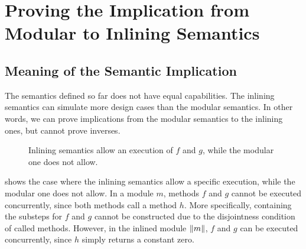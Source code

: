 \chapter{Proving the Implication from Modular to Inlining Semantics}
\label{chap-implication}

\section{Meaning of the Semantic Implication} %

The semantics defined so far does not have equal capabilities. The
inlining semantics can simulate more design cases than the modular
semantics. In other words, we can prove implications from the modular
semantics to the inlining ones, but cannot prove inverses.

\begin{figure}[t]
  \begin{subfigure}[b]{0.5\textwidth}
  \end{subfigure}
  \begin{subfigure}[b]{0.5\textwidth}
  \end{subfigure}
  \caption{Inlining semantics allow an execution of $f$ and $g$, while
    the modular one does not allow.}
  \label{ex-inlining-covers-more}
\end{figure}

 shows the case where the inlining
semantics allow a specific execution, while the modular one does not
allow. In a module $m$, methods $f$ and $g$ cannot be executed
concurrently, since both methods call a method $h$. More specifically,
\Substeps{} containing the substeps for $f$ and $g$ cannot be
constructed due to the disjointness condition of called
methods. However, in the inlined module $\| m \|$, $f$ and $g$ can
be executed concurrently, since $h$ simply returns a constant zero.

